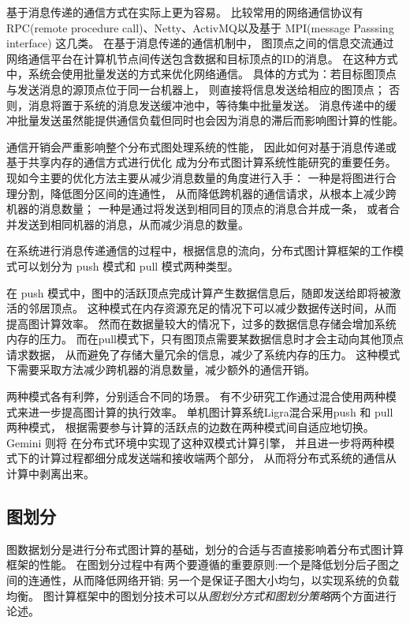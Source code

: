 基于消息传递的通信方式在实际上更为容易。
比较常用的网络通信协议有
RPC(remote procedure call)\cite{rpc}、Netty\cite{netty}、ActivMQ\cite{activemq}以及基于 MPI(message Passsing interface)\cite{mpi}
这几类。
在基于消息传递的通信机制中，
图顶点之间的信息交流通过网络通信平台在计算机节点间传送包含数据和目标顶点的ID的消息。
在这种方式中，系统会使用批量发送的方式来优化网络通信。
具体的方式为：若目标图顶点与发送消息的源顶点位于同一台机器上，
则直接将信息发送给相应的图顶点；
否则，消息将置于系统的消息发送缓冲池中，等待集中批量发送。
消息传递中的缓冲批量发送虽然能提供通信负载但同时也会因为消息的滞后而影响图计算的性能。


通信开销会严重影响整个分布式图处理系统的性能，
因此如何对基于消息传递或基于共享内存的通信方式进行优化
成为分布式图计算系统性能研究的重要任务。
现如今主要的优化方法主要从减少消息数量的角度进行入手：
一种是将图进行合理分割，降低图分区间的连通性，
从而降低跨机器的通信请求，从根本上减少跨机器的消息数量；
一种是通过将发送到相同目的顶点的消息合并成一条，
或者合并发送到相同机器的消息，从而减少消息的数量。


在系统进行消息传递通信的过程中，根据信息的流向，分布式图计算框架的工作模式可以划分为 push 模式和 pull 模式两种类型。

在 push 模式中，图中的活跃顶点完成计算产生数据信息后，随即发送给即将被激活的邻居顶点。
这种模式在内存资源充足的情况下可以减少数据传送时间，从而提高图计算效率。
然而在数据量较大的情况下，过多的数据信息存储会增加系统内存的压力。
而在pull模式下，只有图顶点需要某数据信息时才会主动向其他顶点请求数据，
从而避免了存储大量冗余的信息，减少了系统内存的压力。
这种模式下需要采取方法减少跨机器的消息数量，减少额外的通信开销。

两种模式各有利弊，分别适合不同的场景。
有不少研究工作通过混合使用两种模式来进一步提高图计算的执行效率。
单机图计算系统Ligra\cite{Shun@PPoPP13}混合采用push 和 pull 两种模式，
根据需要参与计算的活跃点的边数在两种模式间自适应地切换。
Gemini\cite{Zhu@OSDI16} 则将
在分布式环境中实现了这种双模式计算引擎，
并且进一步将两种模式下的计算过程都细分成发送端和接收端两个部分，
从而将分布式系统的通信从计算中剥离出来。

\subsection{图划分}

图数据划分是进行分布式图计算的基础，划分的合适与否直接影响着分布式图计算框架的性能。
在图划分过程中有两个要遵循的重要原则:一个是降低划分后子图之间的连通性，从而降低网络开销;
另一个是保证子图大小均匀，以实现系统的负载均衡\cite{reviewruc}。
图计算框架中的图划分技术可以从\textit{图划分方式和图划分策略}两个方面进行论述。

